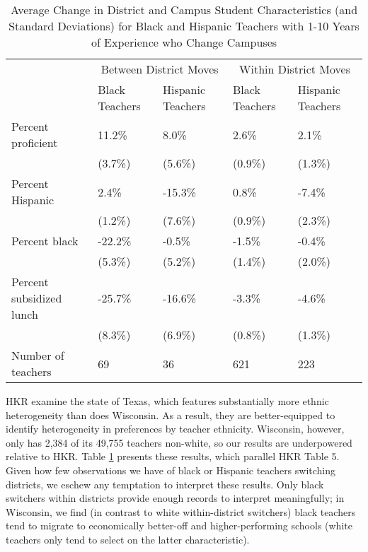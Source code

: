 \documentclass[12pt,]{article}
\begin{document}
\begin{table}[htbp]
\centering
\begin{tabular}{lp{}p{}p{}p{}}
  \hline
 & \multicolumn{2}{c}{Between District Moves} & \multicolumn{2}{c}{Within District Moves}\\ \cline{2-5}
 & Black Teachers & Hispanic Teachers & Black Teachers & Hispanic Teachers \\
  \hline
Percent proficient & 11.2\% & 8.0\% & 2.6\% & 2.1\% \\ 
   & (3.7\%) & (5.6\%) & (0.9\%) & (1.3\%) \\ 
  Percent Hispanic & 2.4\% & -15.3\% & 0.8\% & -7.4\% \\ 
   & (1.2\%) & (7.6\%) & (0.9\%) & (2.3\%) \\ 
  Percent black & -22.2\% & -0.5\% & -1.5\% & -0.4\% \\ 
   & (5.3\%) & (5.2\%) & (1.4\%) & (2.0\%) \\ 
  Percent subsidized lunch & -25.7\% & -16.6\% & -3.3\% & -4.6\% \\ 
   & (8.3\%) & (6.9\%) & (0.8\%) & (1.3\%) \\ 
  Number of teachers & 69 & 36 & 621 & 223 \\ 
   \hline
\end{tabular}
\caption{Average Change in District and Campus Student Characteristics (and Standard Deviations) for Black and Hispanic Teachers with 1-10 Years of Experience who Change Campuses} 
\label{tbl:change_by_eth}
\end{table}

HKR examine the state of Texas, which features substantially more ethnic
heterogeneity than does Wisconsin. As a result, they are better-equipped
to identify heterogeneity in preferences by teacher ethnicity.
Wisconsin, however, only has 2,384 of its 49,755 teachers non-white, so
our results are underpowered relative to HKR. Table
\ref{tbl:change_by_eth} presents these results, which parallel HKR Table
5. Given how few observations we have of black or Hispanic teachers
switching districts, we eschew any temptation to interpret these
results. Only black switchers within districts provide enough records to
interpret meaningfully; in Wisconsin, we find (in contrast to white
within-district switchers) black teachers tend to migrate to
economically better-off and higher-performing schools (white teachers
only tend to select on the latter characteristic).
\end{document}
